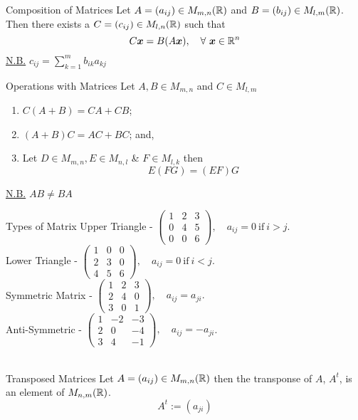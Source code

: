 \documentclass[11pt,a4paper]{article}
\begin{document}
\subtitle{Theorem 3.08 - }{Composition of Matrices}
Let $A = (a_{ij}) \in M_{m,n}(\mathbb{R})$ and $B = (b_{ij}) \in M_{l,m}(\mathbb{R})$.\\
Then there exists a $C = (c_{ij}) \in M_{l,n}(\mathbb{R})$ such that
$$C\boldsymbol{x} = B(A\boldsymbol{x}), \quad \forall\ \boldsymbol{x} \in \mathbb{R}^n$$
\underline{N.B.} $c_{ij} = \sum_{k=1}^m b_{ik} a_{kj}$ \\

\subtitle{Theorem 3.09 - }{Operations with Matrices}
Let $A, B \in M_{m,n}$ and $C \in M_{l,m}$
\begin{enumerate}[label=\roman*)]
  \item $C(A + B) = CA + CB$;
  \item $(A + B)C = AC + BC$; and,
  \item Let $D \in M_{m,n}, E \in M_{n,l}$ \& $F \in M_{l, k}$ then $$E(FG) = (EF)G$$
\end{enumerate}
\underline{N.B.} $AB \not = BA$ \\

\subtitle{Definition 3.10 - }{Types of Matrix}
Upper Triangle - $\begin{pmatrix}
1 & 2 & 3 \\
0 & 4 & 5 \\
0 & 0 & 6
\end{pmatrix},\quad a_{ij} = 0 \mathrm{\ if\ } i > j$. \\
Lower Triangle - $\begin{pmatrix}
1 & 0 & 0 \\
2 & 3 & 0 \\
4 & 5 & 6
\end{pmatrix},\quad a_{ij} = 0 \mathrm{\ if\ } i < j$. \\
Symmetric Matrix - $\begin{pmatrix}
1 & 2 & 3 \\
2 & 4 & 0 \\
3 & 0 & 1
\end{pmatrix},\quad a_{ij} = a_{ji}.$ \\
Anti-Symmetric - $\begin{pmatrix}
1 & -2 & -3 \\
2 & 0 & -4 \\
3 & 4 & -1
\end{pmatrix},\quad a_{ij} = -a_{ji}$. \\\\

\subtitle{Definition 3.11 - }{Transposed Matrices}
Let $A = (a_{ij}) \in M_{m,n}(\mathbb{R})$ then the transponse of $A$, $A^t$, is an element of $M_{n,m}(\mathbb{R})$.
$$A^t := (a_{ji})$$
\end{document}
